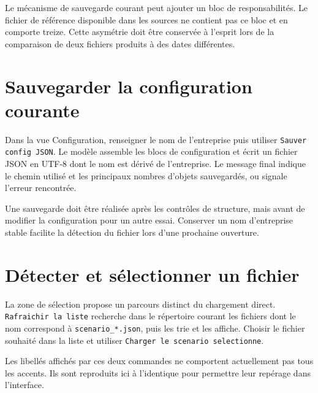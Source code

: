 Le mécanisme de sauvegarde courant peut ajouter un bloc de responsabilités. Le fichier de référence disponible dans les sources ne contient pas ce bloc et en comporte treize. Cette asymétrie doit être conservée à l'esprit lors de la comparaison de deux fichiers produits à des dates différentes.


\section{Sauvegarder la configuration courante}

Dans la vue Configuration, renseigner le nom de l'entreprise puis utiliser \texttt{Sauver config JSON}. Le modèle assemble les blocs de configuration et écrit un fichier JSON en UTF-8 dont le nom est dérivé de l'entreprise. Le message final indique le chemin utilisé et les principaux nombres d'objets sauvegardés, ou signale l'erreur rencontrée.



Une sauvegarde doit être réalisée après les contrôles de structure, mais avant de modifier la configuration pour un autre essai. Conserver un nom d'entreprise stable facilite la détection du fichier lors d'une prochaine ouverture.

\section{Détecter et sélectionner un fichier}

La zone de sélection propose un parcours distinct du chargement direct. \texttt{Rafraichir la liste} recherche dans le répertoire courant les fichiers dont le nom correspond à \texttt{scenario\_*.json}, puis les trie et les affiche. Choisir le fichier souhaité dans la liste et utiliser \texttt{Charger le scenario selectionne}.

Les libellés affichés par ces deux commandes ne comportent actuellement pas tous les accents. Ils sont reproduits ici à l'identique pour permettre leur repérage dans l'interface.

